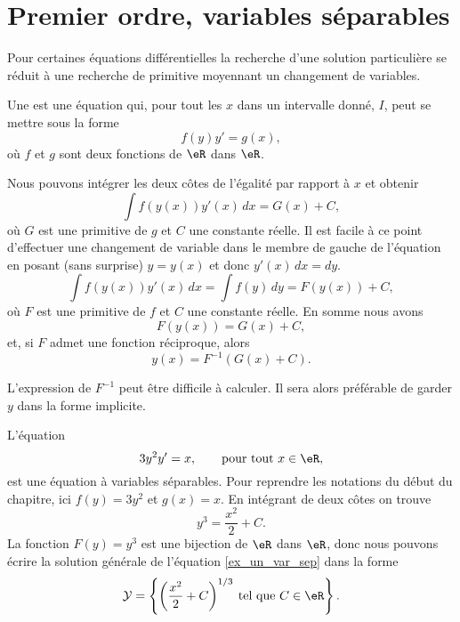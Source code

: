 \section{Premier ordre, variables séparables}

Pour certaines équations différentielles la recherche d'une solution particulière se réduit à une recherche de primitive moyennant un changement de variables.
\begin{definition}
Une   est une équation qui, pour tout les \(x\) dans un intervalle donné, \(I\), peut se mettre sous la forme
\begin{equation}\label{eq_var_sep}
  f(y)y' = g(x),
\end{equation}
o\`u \(f\) et \(g\) sont deux fonctions de \(\eR\) dans \(\eR\).
\end{definition}
Nous pouvons intégrer les deux côtes de l'égalité par rapport à \(x\) et obtenir
\[
  \int f(y(x))y'(x)\, dx = G(x)+C,
\]
o\`u $G$ est une primitive de $g$ et $C$ une constante réelle. Il est facile \`a ce point d'effectuer une changement de variable dans le membre de gauche de l'équation en posant (sans surprise) \(y= y(x)\) et donc \(y'(x)\,dx = dy\).
\[
  \int f(y(x))y'(x)\, dx =  \int f(y)\, dy  = F(y(x)) + C ,
\]
o\`u $F$ est une primitive de $f$ et $C$ une constante réelle. En somme nous avons
\[
  F(y(x)) = G(x) + C ,
\]
et, si $F$ admet une fonction réciproque, alors
\begin{equation}
  y(x) = F^{-1} (G(x)+C).
\end{equation}
\begin{remark}
  L'expression de $F^{-1} $ peut être difficile à calculer. Il sera alors préférable de garder $y$ dans la forme implicite.
\end{remark}

\begin{example}
  L'équation
  \begin{equation}\label{ex_un_var_sep}
    3y^2 y' = x, \qquad\text{pour tout } x\in\eR,
  \end{equation}
est une équation à variables séparables. Pour reprendre les notations du début du chapitre, ici \(f(y) = 3y^2\) et \(g(x) = x\). En intégrant de deux côtes on trouve
\[
y^3 = \frac{x^2}{2} + C .
\]
La fonction $F(y) = y^3$ est une bijection de $\eR$ dans $\eR$, donc nous pouvons écrire la solution générale de l'équation \eqref{ex_un_var_sep} dans la forme
\[
\mathcal{Y} =\left\{ \left(\frac{x^2}{2} + C \right)^{1/3} \:\text{tel que } C\in\eR\right\}.
\]
\end{example}

